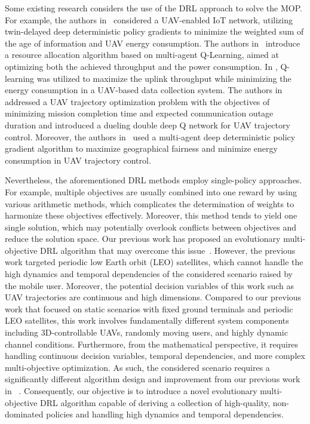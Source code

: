 \par Some existing research considers the use of the DRL approach to solve the MOP. For example, the authors in~\cite{Sun2021aoi-energy-aware} considered a UAV-enabled IoT network, utilizing twin-delayed deep deterministic policy gradients to minimize the weighted sum of the age of information and UAV energy consumption. The authors in~\cite{Cui2020multi-agent} introduce a resource allocation algorithm based on multi-agent Q-Learning, aimed at optimizing both the achieved throughput and the power consumption. In \cite{Fu2021energy-efficient}, Q-learning was utilized to maximize the uplink throughput while minimizing the energy consumption in a UAV-based data collection system. The authors in~\cite{Zeng2021simultaneous} addressed a UAV trajectory optimization problem with the objectives of minimizing mission completion time and expected communication outage duration and introduced a dueling double deep Q network for UAV trajectory control. Moreover, the authors in~\cite{Zhao2022multi-agent} used a multi-agent deep deterministic policy gradient algorithm to maximize geographical fairness and minimize energy consumption in UAV trajectory control. 

\par Nevertheless, the aforementioned DRL methods employ single-policy approaches. For example, multiple objectives are usually combined into one reward by using various arithmetic methods, which complicates the determination of weights to harmonize these objectives effectively. Moreover, this method tends to yield one single solution, which may potentially overlook conflicts between objectives and reduce the solution space. Our previous work has proposed an evolutionary multi-objective DRL algorithm that may overcome this issue~\cite{10679228}. However, the previous work targeted periodic low Earth orbit (LEO) satellites, which cannot handle the high dynamics and temporal dependencies of the considered scenario raised by the mobile user. Moreover, the potential decision variables of this work such as UAV trajectories are continuous and high dimensions. Compared to our previous work that focused on static scenarios with fixed ground terminals and periodic LEO satellites, this work involves fundamentally different system components including 3D-controllable UAVs, randomly moving users, and highly dynamic channel conditions. Furthermore, from the mathematical perspective, it requires handling continuous decision variables, temporal dependencies, and more complex multi-objective optimization. As such, the considered scenario requires a significantly different algorithm design and improvement from our previous work in ~\cite{10679228}. Consequently, our objective is to introduce a novel evolutionary multi-objective DRL algorithm capable of deriving a collection of high-quality, non-dominated policies and handling high dynamics and temporal dependencies.


%
%